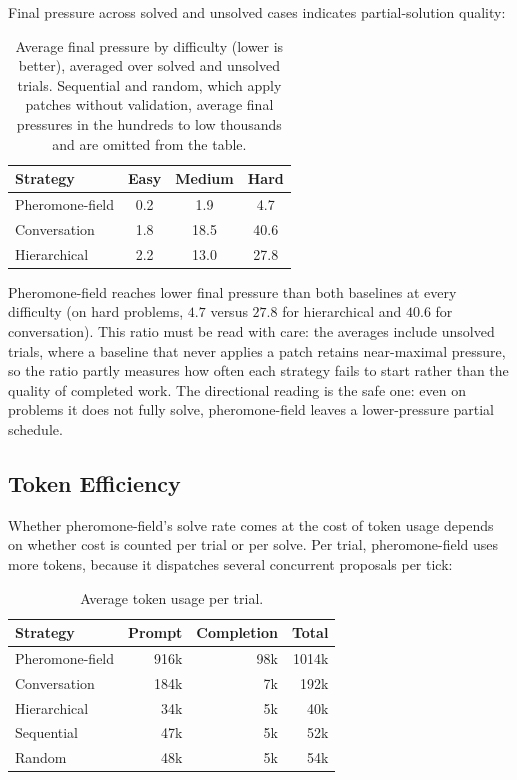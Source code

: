 Final pressure across solved and unsolved cases indicates partial-solution quality:

\begin{table}[htbp]
\centering
\small
\begin{tabular}{@{}lccc@{}}
\toprule
\textbf{Strategy} & \textbf{Easy} & \textbf{Medium} & \textbf{Hard} \\
\midrule
Pheromone-field & 0.2 & 1.9 & 4.7 \\
Conversation & 1.8 & 18.5 & 40.6 \\
Hierarchical & 2.2 & 13.0 & 27.8 \\
\bottomrule
\end{tabular}
\caption{Average final pressure by difficulty (lower is better), averaged over solved and unsolved trials. Sequential and random, which apply patches without validation, average final pressures in the hundreds to low thousands and are omitted from the table.}
\label{tab:final-pressure}
\end{table}

Pheromone-field reaches lower final pressure than both baselines at every difficulty (on hard problems, $4.7$ versus $27.8$ for hierarchical and $40.6$ for conversation). This ratio must be read with care: the averages include unsolved trials, where a baseline that never applies a patch retains near-maximal pressure, so the ratio partly measures how often each strategy fails to start rather than the quality of completed work. The directional reading is the safe one: even on problems it does not fully solve, pheromone-field leaves a lower-pressure partial schedule.

\subsection{Token Efficiency}
\label{sec:token-efficiency}

Whether pheromone-field's solve rate comes at the cost of token usage depends on whether cost is counted per trial or per solve. Per trial, pheromone-field uses more tokens, because it dispatches several concurrent proposals per tick:

\begin{table}[htbp]
\centering
\small
\begin{tabular}{@{}lrrr@{}}
\toprule
\textbf{Strategy} & \textbf{Prompt} & \textbf{Completion} & \textbf{Total} \\
\midrule
Pheromone-field & 916k & 98k & 1014k \\
Conversation & 184k & 7k & 192k \\
Hierarchical & 34k & 5k & 40k \\
Sequential & 47k & 5k & 52k \\
Random & 48k & 5k & 54k \\
\bottomrule
\end{tabular}
\caption{Average token usage per trial.}
\label{tab:tokens-per-trial}
\end{table}

